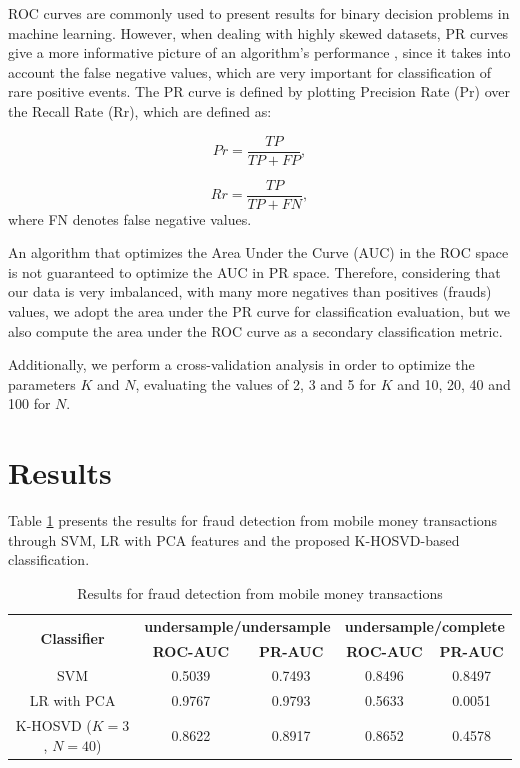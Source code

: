 ROC curves are commonly used to present results for binary decision problems in machine learning. However, when dealing with highly skewed datasets, PR curves give a more informative picture of an algorithm’s performance \cite{davis2006relationship, he2009learning}, since it takes into account the false negative values, which are very important for classification of rare positive events. The PR curve is defined by plotting Precision Rate (Pr) over the Recall Rate (Rr), which are defined as:

\begin{equation}\label{eq:4_eq06}
	Pr = \frac{TP}{TP + FP},
\end{equation}

\begin{equation}\label{eq:4_eq07}
	Rr = \frac{TP}{TP + FN},
\end{equation}
where FN denotes false negative values.

An algorithm that optimizes the Area Under the Curve (AUC) in the ROC space is not guaranteed to optimize the AUC in PR space. Therefore, considering that our data is very imbalanced, with many more negatives than positives (frauds) values, we adopt the area under the PR curve for classification evaluation, but we also compute the area under the ROC curve as a secondary classification metric.

Additionally, we perform a cross-validation analysis in order to optimize the parameters $K$ and $N$, evaluating the values of 2, 3 and 5 for $K$ and 10, 20, 40 and 100 for $N$.


\section{Results}
\label{sec:4_results}

Table \ref{tab:4_tab1} presents the results for fraud detection from mobile money transactions through SVM, LR with PCA features and the proposed K-HOSVD-based classification.

\begin{table}[h!]
  \centering
  \caption{Results for fraud detection from mobile money transactions} 
  \label{tab:4_tab1}
  \begin{tabular}{ c c c c c }
	\toprule
	\multirow{2}{*}{\textbf{Classifier}}   &\multicolumn{2}{c}{\textbf{undersample/undersample}} &\multicolumn{2}{c}{\textbf{undersample/complete}}\\ 
			\hhline{~----}
			&\textbf{ROC-AUC} &\textbf{PR-AUC} &\textbf{ROC-AUC} &\textbf{PR-AUC}\\
	\midrule
	SVM &0.5039 &0.7493 &0.8496 &0.8497 \\
	LR with PCA &0.9767 &0.9793 &0.5633 &0.0051 \\
	K-HOSVD ($K=3$, $N=40$) &0.8622 &0.8917 &0.8652 &0.4578 \\
    \bottomrule
  \end{tabular}
\end{table}

